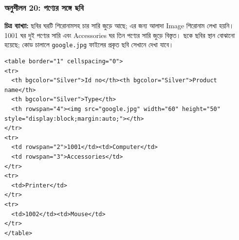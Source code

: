 \par\noindent\begin{minipage}[t]{\linewidth}\vspace{0pt}
\subsubsection{অনুশীলন 20: পণ্যের সঙ্গে ছবি}%
\par\noindent
\begin{minipage}[t]{.44\linewidth}\vspace{0pt}
\begingroup\centering
{}
\par\endgroup
\end{minipage}\hfill
\begin{minipage}[t]{.52\linewidth}\vspace{0pt}
\textbf{চিত্র ব্যাখ্যা:} ছবির ঘরটি শিরোনামসহ চার সারি জুড়ে আছে; এর জন্য আলাদা Image শিরোনাম লেখা হয়নি। 1001 ঘর দুই পণ্যের সারি এবং Accessories ঘর তিন পণ্যের সারি জুড়ে বিস্তৃত। ছকে ছবির স্থান বোঝানো হয়েছে; কোড চালালে \texttt{google.jpg} ফাইলের প্রকৃত ছবি সেখানে দেখা যাবে।
\end{minipage}
\par\smallskip
\end{minipage}\par\smallskip
{}
\par{}\par\smallskip
\begin{verbatim}
<table border="1" cellspacing="0">
<tr>
  <th bgcolor="Silver">Id no</th><th bgcolor="Silver">Product name</th>
  <th bgcolor="Silver">Type</th>
  <th rowspan="4"><img src="google.jpg" width="60" height="50" style="display:block;margin:auto;"></th>
</tr>
<tr>
  <td rowspan="2">1001</td><td>Computer</td>
  <td rowspan="3">Accessories</td>
</tr>
<tr>
  <td>Printer</td>
</tr>
<tr>
  <td>1002</td><td>Mouse</td>
</tr>
</table>
\end{verbatim}
\smallskip


